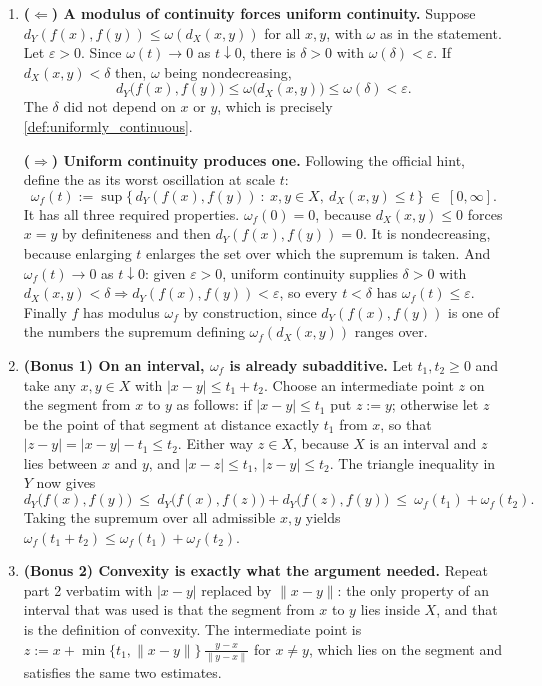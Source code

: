 \begin{exercisesolution}
\begin{enumerate}[label=\textbf{\arabic*.}]
  \item \textbf{($\Leftarrow$) A modulus of continuity forces uniform continuity.} Suppose
    $d_Y(f(x),f(y)) \leq \omega(d_X(x,y))$ for all $x,y$, with $\omega$ as in the statement. Let
    $\varepsilon > 0$. Since $\omega(t) \to 0$ as $t \downarrow 0$, there is $\delta > 0$ with
    $\omega(\delta) < \varepsilon$. If $d_X(x,y) < \delta$ then, $\omega$ being nondecreasing,
    \[d_Y\big(f(x),f(y)\big) \leq \omega\big(d_X(x,y)\big) \leq \omega(\delta) < \varepsilon.\]
    The $\delta$ did not depend on $x$ or $y$, which is precisely
    \cref{def:uniformly_continuous}.

    \textbf{($\Rightarrow$) Uniform continuity produces one.} Following the official hint, define
    the  as its worst oscillation at scale $t$:
    \[\omega_f(t) := \sup\big\{\,d_Y(f(x),f(y))\ :\ x,y \in X,\ d_X(x,y) \leq t\,\big\}
      \ \in\ [0,\infty].\]
    It has all three required properties. $\omega_f(0) = 0$, because $d_X(x,y) \leq 0$ forces
    $x=y$ by definiteness and then $d_Y(f(x),f(y)) = 0$. It is nondecreasing, because enlarging
    $t$ enlarges the set over which the supremum is taken. And $\omega_f(t) \to 0$ as
    $t \downarrow 0$: given $\varepsilon > 0$, uniform continuity supplies $\delta > 0$ with
    $d_X(x,y) < \delta \Rightarrow d_Y(f(x),f(y)) < \varepsilon$, so every $t < \delta$ has
    $\omega_f(t) \leq \varepsilon$. Finally $f$ has modulus $\omega_f$ by construction, since
    $d_Y(f(x),f(y))$ is one of the numbers the supremum defining $\omega_f(d_X(x,y))$ ranges
    over.
  \item \textbf{(Bonus 1) On an interval, $\omega_f$ is already subadditive.} Let
    $t_1,t_2 \geq 0$ and take any $x,y \in X$ with $|x-y| \leq t_1+t_2$. Choose an intermediate
    point $z$ on the segment from $x$ to $y$ as follows: if $|x-y| \leq t_1$ put $z := y$;
    otherwise let $z$ be the point of that segment at distance exactly $t_1$ from $x$, so that
    $|z-y| = |x-y| - t_1 \leq t_2$. Either way $z \in X$, because $X$ is an interval and $z$ lies
    between $x$ and $y$, and $|x-z| \leq t_1$, $|z-y| \leq t_2$. The triangle inequality in $Y$
    now gives
    \[d_Y\big(f(x),f(y)\big) \ \leq\ d_Y\big(f(x),f(z)\big) + d_Y\big(f(z),f(y)\big)
      \ \leq\ \omega_f(t_1) + \omega_f(t_2).\]
    Taking the supremum over all admissible $x,y$ yields
    $\omega_f(t_1+t_2) \leq \omega_f(t_1) + \omega_f(t_2)$.
  \item \textbf{(Bonus 2) Convexity is exactly what the argument needed.} Repeat part 2 verbatim
    with $|x-y|$ replaced by $\lVert x-y\rVert$: the only property of an interval that was used
    is that the segment from $x$ to $y$ lies inside $X$, and that is the definition of convexity.
    The intermediate point is $z := x + \min\{t_1,\lVert x-y\rVert\}\,\frac{y-x}{\lVert
    y-x\rVert}$ for $x \neq y$, which lies on the segment and satisfies the same two estimates.
\end{enumerate}


\end{exercisesolution}
